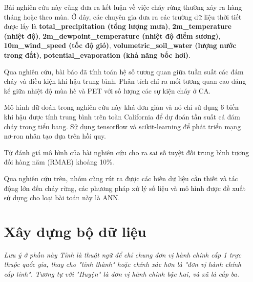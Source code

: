 \documentclass{article}
\begin{document}
Bài nghiên cứu này cũng đưa ra kết luận về việc cháy rừng thường xảy ra hàng tháng hoặc theo mùa. Ở đây, các chuyên gia đưa ra các trường dữ liệu thời tiết được lấy là \textbf{total\_precipitation (tổng lượng mưa)}, \textbf{2m\_temperature (nhiệt độ)}, \textbf{2m\_dewpoint\_temperature (nhiệt độ điểm sương)}, \textbf{10m\_wind\_speed (tốc độ gió)}, \textbf{volumetric\_soil\_water (lượng nước trong đất)}, \textbf{potential\_evaporation (khả năng bốc hơi)}.

Qua nghiên cứu, bài báo đã tính toán hệ số tương quan giữa tuần suất các đám cháy và điều kiện khi hậu trung bình. Phân tích chỉ ra mối tương quan cao đáng kể giữa nhiệt độ mùa hè và PET với số lượng các sự kiện cháy ở CA.

Mô hình dữ đoán trong nghiên cứu này khá đơn giản và nó chỉ sử dụng 6 biến khi hậu được tính trung bình trên toàn California để dự đoán tần suất cá đám cháy trong tiểu bang. Sử dụng tensorflow và scikit-learning để phát triển mạng nơ-ron nhân tạo dựa trên hồi quy.

Từ đánh giá mô hình của bài nghiên cứu cho ra sai số tuyệt đối trung bình tương đối hàng năm (RMAE) khoảng 10\%.

Qua nghiên cứu trên, nhóm cũng rút ra được các biến dữ liệu cần thiết và tác động lớn đến cháy rừng, các phương pháp xử lý số liệu và mô hình được đề xuất sử dụng cho loại bài toán này là ANN.
\section{Xây dựng bộ dữ liệu}


\emph{Lưu ý ở phần này Tỉnh là thuật ngữ để chỉ chung đơn vị hành chính cấp 1 trực thuộc quốc gia, thay cho "tỉnh thành" hoặc chính xác hơn là "đơn vị hành chính cấp tỉnh"\cite{website:wiki_province}. Tương tự với "Huyện" là đơn vị hành chính bậc hai, và xã là cấp ba.}
\end{document}
